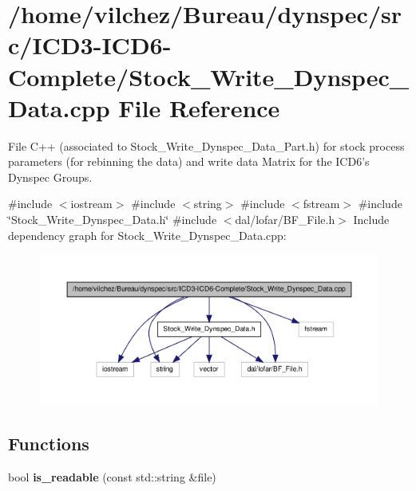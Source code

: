 \section{/home/vilchez/\-Bureau/dynspec/src/\-I\-C\-D3-\/\-I\-C\-D6-\/\-Complete/\-Stock\-\_\-\-Write\-\_\-\-Dynspec\-\_\-\-Data.cpp \-File \-Reference}
\label{_stock___write___dynspec___data_8cpp}


\-File \-C++ (associated to \-Stock\-\_\-\-Write\-\_\-\-Dynspec\-\_\-\-Data\-\_\-\-Part.\-h) for stock process parameters (for rebinning the data) and write data \-Matrix for the \-I\-C\-D6's \-Dynspec \-Groups.  


{\ttfamily \#include $<$iostream$>$}\*
{\ttfamily \#include $<$string$>$}\*
{\ttfamily \#include $<$fstream$>$}\*
{\ttfamily \#include \char`\"{}\-Stock\-\_\-\-Write\-\_\-\-Dynspec\-\_\-\-Data.\-h\char`\"{}}\*
{\ttfamily \#include $<$dal/lofar/\-B\-F\-\_\-\-File.\-h$>$}\*
\-Include dependency graph for \-Stock\-\_\-\-Write\-\_\-\-Dynspec\-\_\-\-Data.\-cpp\-:\nopagebreak
\begin{figure}[H]
\begin{center}
\leavevmode
\includegraphics[width=350pt]{_stock___write___dynspec___data_8cpp__incl}
\end{center}
\end{figure}
\subsection*{\-Functions}
\begin{DoxyCompactItemize}
\item 
bool {\bf is\-\_\-readable} (const std\-::string \&file)
\end{DoxyCompactItemize}


